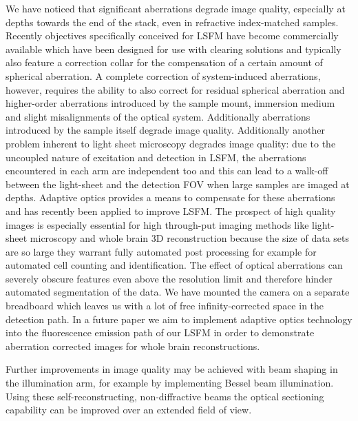 \documentclass[12pt]{spieman}  %
\begin{document}
We have noticed that significant aberrations degrade image quality, especially at depths towards the end of the stack, even in refractive index-matched samples. Recently objectives specifically conceived for LSFM have become commercially available\cite{Marx2014} which have been designed for use with clearing solutions and typically also feature a correction collar for the compensation of a certain amount of spherical aberration. A complete correction of system-induced aberrations, however, requires the ability to also correct for residual spherical aberration and higher-order aberrations introduced by the sample mount, immersion medium and slight misalignments of the optical system. Additionally aberrations introduced by the sample itself degrade image quality. Additionally another problem inherent to light sheet microscopy degrades image quality: due to the uncoupled nature of excitation and detection in LSFM, the aberrations encountered in each arm are independent too and this can lead to a walk-off between the light-sheet and the detection FOV when large samples are imaged at depths. Adaptive optics\cite{Booth2007} provides a means to compensate for these aberrations and has recently been applied to improve LSFM\cite{Jorand2012,Wang2014}. The prospect of high quality images is especially essential for high through-put imaging methods like light-sheet microscopy and whole brain 3D reconstruction because the size of data sets are so large they warrant fully automated post processing for example for automated cell counting and identification\cite{Frasconi2014}. The effect of optical aberrations can severely obscure features even above the resolution limit and therefore hinder automated segmentation of the data. We have mounted the camera on a separate breadboard which leaves us with a lot of free infinity-corrected space in the detection path. In a future paper we aim to implement adaptive optics technology into the fluorescence emission path of our LSFM in order to demonstrate aberration corrected images for whole brain reconstructions. 

Further improvements in image quality may be achieved with beam shaping in the illumination arm, for example by implementing Bessel beam illumination\cite{Fahrbach2010,Planchon2011,Gao2014}. Using these self-reconstructing, non-diffractive beams the optical sectioning capability can be improved over an extended field of view.
\end{document}
